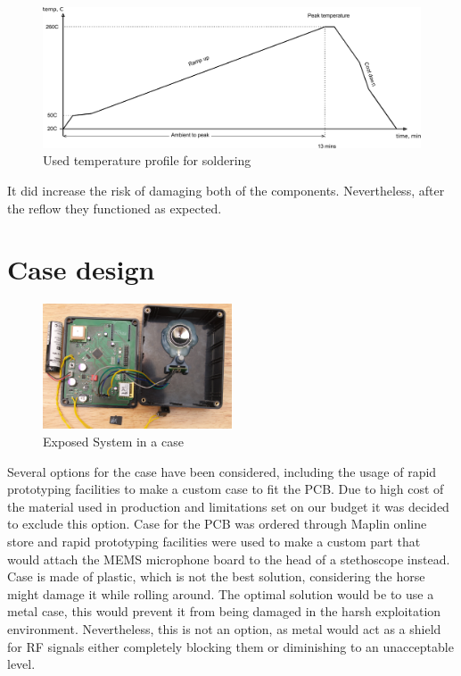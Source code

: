 \begin{figure}
\centering
\includegraphics[width=\textwidth]{Images/Thermal_profile_used}
\caption{Used temperature profile for soldering}
\label{fig:temp_profile_used}
\end{figure}

It did increase the risk of damaging both of the components. Nevertheless, after the reflow they functioned as expected.


\section{Case design}
\begin{figure}[htb]
\centering
\includegraphics[width=0.5\textwidth]{Images/case_inside.jpg}
\caption{Exposed System in a case}
\label{fig:case_monitor}
\end{figure}
Several options for the case have been considered, including the usage of rapid prototyping facilities to make a custom case to fit the PCB. Due to high cost of the material used in production and limitations set on our budget it was decided to exclude this option. Case for the PCB was ordered through Maplin online store and rapid prototyping facilities were used to make a custom part that would attach the MEMS microphone board to the head of a stethoscope instead. Case is made of plastic, which is not the best solution, considering the horse might damage it while rolling around. The optimal solution would be to use a metal case, this would prevent it from being damaged in the harsh exploitation environment. Nevertheless, this is not an option, as metal would act as a shield for RF signals either completely blocking them or diminishing to an unacceptable level. 

